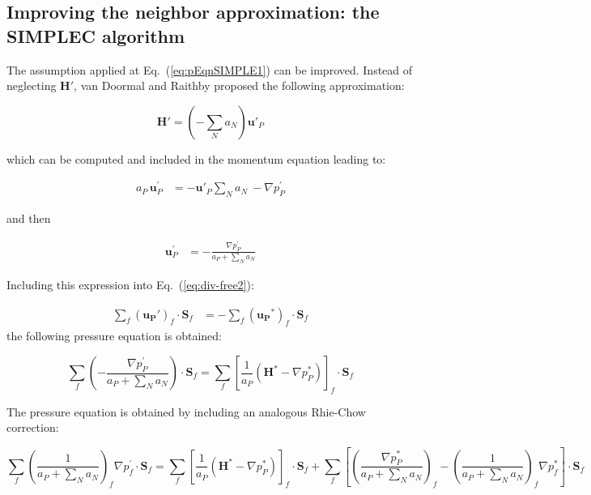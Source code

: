\documentclass[final,3p,times,10pt,onecolumn]{myElsarticle}
\numberwithin{equation}{section}
\begin{document}
\subsection{Improving the neighbor approximation: the SIMPLEC algorithm}
The assumption applied at Eq.~(\ref{eq:pEqnSIMPLE1}) can be improved. Instead of neglecting $\boldsymbol{H}'$, van Doormal and Raithby \cite{vanDoormal} proposed the following approximation:

\begin{equation}\label{eq:H_SIMPLEC}
\boldsymbol{H}'= \left(-\sum_N a_N\right) \boldsymbol{u}'_P
\end{equation}

\noindent which can be computed and included in the momentum equation leading to:

\begin{align}\label{eq:uPrimeSIMPLEC}
a_P\,\boldsymbol{u}_P^{'} &= -\boldsymbol{u}'_P \sum_{N} a_{N}\ - \nabla p_P^{'}
\end{align}

\noindent and then

\begin{align}\label{eq:uPrimeSIMPLEC2}
 \boldsymbol{u}_P^{'} &= - \frac{\nabla p_P^{'}}{a_P + \sum_{N} a_{N}}
\end{align}

Including this expression into Eq.~(\ref{eq:div-free2}):

\begin{align} 
\sum_f \left(\boldsymbol{u_P}'\right)_{f} \cdot \boldsymbol{S}_f &= -\sum_f \left(\boldsymbol{u_P}^{*}\right)_{f} \cdot \boldsymbol{S}_f \label{eq:div-free4}
\end{align}
\noindent the following pressure equation is obtained:

\begin{equation}
\label{eq:pEqnSIMPLEC1}
\sum_f 
\left(
- \frac
{
\nabla p_P^{'}
}
{
a_P + \sum_{N} a_{N}
}
\right)
\cdot 
\boldsymbol{S}_f
= 
\sum_f 
\left[
\frac{1}{a_P}
\left(
\boldsymbol{H}^* - \nabla p_P^{*}
\right)
\right]_f 
\cdot
\boldsymbol{S}_f
\end{equation}

The pressure equation is obtained by including an analogous Rhie-Chow correction:

\begin{equation}\label{eq:pEqnSIMPLEC2}
\sum_f \left(\frac{1}{a_P + \sum_{N} a_{N}}\right)_f \nabla p_f^{'} \cdot \boldsymbol{S}_f= \sum_f \left[\frac{1}{a_P}\left(\boldsymbol{H}^* - \nabla p_P^{*}\right)\right]_f \cdot \boldsymbol{S}_f + \sum_f  \left[ \left( \frac{\nabla p_P^{*}}{a_P + \sum_{N} a_{N}}\right)_f - \left( \frac{1}{a_P + \sum_{N} a_{N}}\right)_f \nabla p_f^{*} \right] \cdot \boldsymbol{S}_f 
\end{equation}
\end{document}
